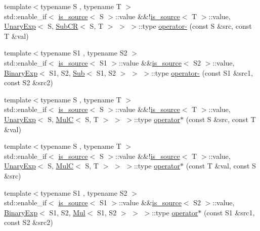 \begin{DoxyCompactItemize}
\item 
{\footnotesize template$<$typename S , typename T $>$ }\\std\+::enable\+\_\+if$<$ \hyperlink{classshark_1_1ndim_1_1is__source}{is\+\_\+source}$<$ S $>$\+::value \&\&!\hyperlink{classshark_1_1ndim_1_1is__source}{is\+\_\+source}$<$ T $>$\+::value, \hyperlink{classshark_1_1ndim_1_1_unary_exp}{Unary\+Exp}$<$ S, \hyperlink{classshark_1_1ndim_1_1_sub_c_r}{Sub\+CR}$<$ S, T $>$ $>$ $>$\+::type \hyperlink{namespaceshark_1_1ndim_aaad5819052035e9b59b06130b328f9aa}{operator-\/} (const S \&src, const T \&val)
\item 
{\footnotesize template$<$typename S1 , typename S2 $>$ }\\std\+::enable\+\_\+if$<$ \hyperlink{classshark_1_1ndim_1_1is__source}{is\+\_\+source}$<$ S1 $>$\+::value \&\&\hyperlink{classshark_1_1ndim_1_1is__source}{is\+\_\+source}$<$ S2 $>$\+::value, \hyperlink{classshark_1_1ndim_1_1_binary_exp}{Binary\+Exp}$<$ S1, S2, \hyperlink{classshark_1_1ndim_1_1_sub}{Sub}$<$ S1, S2 $>$ $>$ $>$\+::type \hyperlink{namespaceshark_1_1ndim_addbe22a064a520607db0585dd2212284}{operator-\/} (const S1 \&src1, const S2 \&src2)
\item 
{\footnotesize template$<$typename S , typename T $>$ }\\std\+::enable\+\_\+if$<$ \hyperlink{classshark_1_1ndim_1_1is__source}{is\+\_\+source}$<$ S $>$\+::value \&\&!\hyperlink{classshark_1_1ndim_1_1is__source}{is\+\_\+source}$<$ T $>$\+::value, \hyperlink{classshark_1_1ndim_1_1_unary_exp}{Unary\+Exp}$<$ S, \hyperlink{classshark_1_1ndim_1_1_mul_c}{MulC}$<$ S, T $>$ $>$ $>$\+::type \hyperlink{namespaceshark_1_1ndim_a41663f041f9fc6fee5b026e8d046cc52}{operator$\ast$} (const S \&src, const T \&val)
\item 
{\footnotesize template$<$typename S , typename T $>$ }\\std\+::enable\+\_\+if$<$ \hyperlink{classshark_1_1ndim_1_1is__source}{is\+\_\+source}$<$ S $>$\+::value \&\&!\hyperlink{classshark_1_1ndim_1_1is__source}{is\+\_\+source}$<$ T $>$\+::value, \hyperlink{classshark_1_1ndim_1_1_unary_exp}{Unary\+Exp}$<$ S, \hyperlink{classshark_1_1ndim_1_1_mul_c}{MulC}$<$ S, T $>$ $>$ $>$\+::type \hyperlink{namespaceshark_1_1ndim_a87b233d59888fe2949738606ff57d3f9}{operator$\ast$} (const T \&val, const S \&src)
\item 
{\footnotesize template$<$typename S1 , typename S2 $>$ }\\std\+::enable\+\_\+if$<$ \hyperlink{classshark_1_1ndim_1_1is__source}{is\+\_\+source}$<$ S1 $>$\+::value \&\&\hyperlink{classshark_1_1ndim_1_1is__source}{is\+\_\+source}$<$ S2 $>$\+::value, \hyperlink{classshark_1_1ndim_1_1_binary_exp}{Binary\+Exp}$<$ S1, S2, \hyperlink{classshark_1_1ndim_1_1_mul}{Mul}$<$ S1, S2 $>$ $>$ $>$\+::type \hyperlink{namespaceshark_1_1ndim_aa4481e240ad9a193e7502a3d5bf9caf3}{operator$\ast$} (const S1 \&src1, const S2 \&src2)

\end{DoxyCompactItemize}
